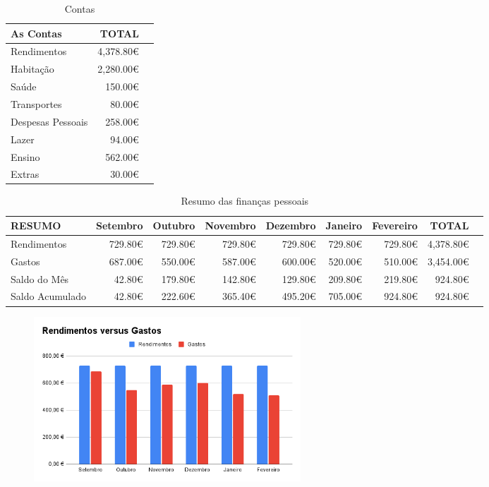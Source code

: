 \documentclass[a4paper,11pt]{report}
\begin{document}
		\begin{center}
			\begin{table}[!h]\centering
				\scriptsize
				\begin{tabular}{lrr}\toprule
					As Contas &TOTAL \\\midrule
					Rendimentos & 4,378.80€ \\
					Habitação & 2,280.00€ \\
					Saúde & 150.00€ \\
					Transportes & 80.00€ \\
					Despesas Pessoais & 258.00€ \\
					Lazer & 94.00€ \\
					Ensino & 562.00€ \\
					Extras & 30.00€ \\
					\bottomrule
				\end{tabular}
				\caption{Contas}\label{tab:contas}
			\end{table}
			\begin{table}[!h]\centering
				\scriptsize
				\begin{tabular}{lrrrrrrrr}\toprule
					RESUMO &Setembro &Outubro &Novembro &Dezembro &Janeiro &Fevereiro &TOTAL \\\midrule
					\cellcolor[HTML]{4285f4}Rendimentos &729.80€ &729.80€ &729.80€ &729.80€ &729.80€ &729.80€ &\cellcolor[HTML]{4285f4}4,378.80€ \\
					\cellcolor[HTML]{4285f4}Gastos &687.00€ &550.00€ &587.00€ &600.00€ &520.00€ &510.00€ &\cellcolor[HTML]{4285f4}3,454.00€ \\
					\cellcolor[HTML]{4285f4}Saldo do Mês &42.80€ &179.80€ &142.80€ &129.80€ &209.80€ &219.80€ &\cellcolor[HTML]{4285f4}924.80€ \\
					\cellcolor[HTML]{4285f4}Saldo Acumulado &42.80€ &222.60€ &365.40€ &495.20€ &705.00€ &924.80€ &\cellcolor[HTML]{4285f4}924.80€ \\
					\bottomrule
				\end{tabular}
				\caption{Resumo das finanças pessoais}\label{tab:resumo }
			\end{table}
			\begin{figure}[h]
				\begin{center}
					\includegraphics[width=10cm]{./rendimentos_gastos_grafico_barra.png}

\end{center}
\end{figure}
\end{center}
\end{document}
